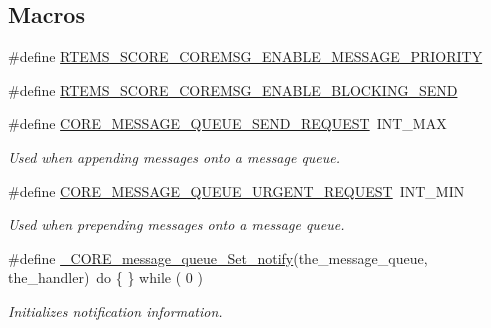 \subsection*{Macros}
\begin{DoxyCompactItemize}
\item 
\#define \mbox{\hyperlink{group__RTEMSScoreMessageQueue_ga5079fee7785d8c344030ead557c2e729}{R\+T\+E\+M\+S\+\_\+\+S\+C\+O\+R\+E\+\_\+\+C\+O\+R\+E\+M\+S\+G\+\_\+\+E\+N\+A\+B\+L\+E\+\_\+\+M\+E\+S\+S\+A\+G\+E\+\_\+\+P\+R\+I\+O\+R\+I\+TY}}
\item 
\#define \mbox{\hyperlink{group__RTEMSScoreMessageQueue_ga09634a9686956a9d7e984334e6d1d9a9}{R\+T\+E\+M\+S\+\_\+\+S\+C\+O\+R\+E\+\_\+\+C\+O\+R\+E\+M\+S\+G\+\_\+\+E\+N\+A\+B\+L\+E\+\_\+\+B\+L\+O\+C\+K\+I\+N\+G\+\_\+\+S\+E\+ND}}
\item 
\#define \mbox{\hyperlink{group__RTEMSScoreMessageQueue_ga6153ca90c7d1c79275c5b41313aba55b}{C\+O\+R\+E\+\_\+\+M\+E\+S\+S\+A\+G\+E\+\_\+\+Q\+U\+E\+U\+E\+\_\+\+S\+E\+N\+D\+\_\+\+R\+E\+Q\+U\+E\+ST}}~I\+N\+T\+\_\+\+M\+AX
\begin{DoxyCompactList}\small\item\em Used when appending messages onto a message queue. \end{DoxyCompactList}\item 
\#define \mbox{\hyperlink{group__RTEMSScoreMessageQueue_ga054fb313d79bf47d885a938654cedf6c}{C\+O\+R\+E\+\_\+\+M\+E\+S\+S\+A\+G\+E\+\_\+\+Q\+U\+E\+U\+E\+\_\+\+U\+R\+G\+E\+N\+T\+\_\+\+R\+E\+Q\+U\+E\+ST}}~I\+N\+T\+\_\+\+M\+IN
\begin{DoxyCompactList}\small\item\em Used when prepending messages onto a message queue. \end{DoxyCompactList}\item 
\#define \mbox{\hyperlink{group__RTEMSScoreMessageQueue_ga9ff0250bdbba22ed859cd8a1a5352c2e}{\+\_\+\+C\+O\+R\+E\+\_\+message\+\_\+queue\+\_\+\+Set\+\_\+notify}}(the\+\_\+message\+\_\+queue,  the\+\_\+handler)~do \{ \} while ( 0 )
\begin{DoxyCompactList}\small\item\em Initializes notification information. \end{DoxyCompactList}\end{DoxyCompactItemize}
